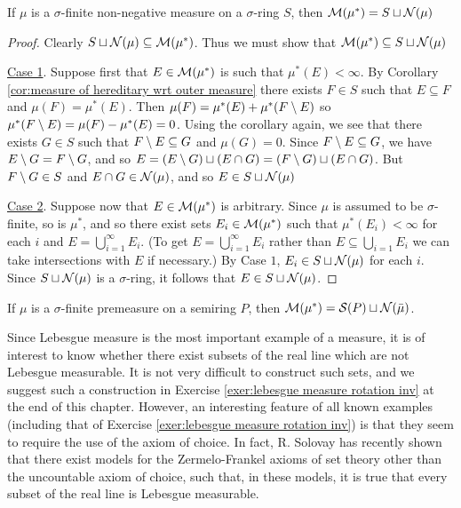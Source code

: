 \begin{theorem}\label{thm:null set completion sigma finite}
If $\mu$ is a $\sigma$-finite non-negative measure on a $\sigma$-ring $S$, then ${\cal M}(\mu^*)=S \sqcup {\cal N}(\mu)$
\end{theorem}

\begin{proof}
Clearly ${S} \sqcup {\cal N}(\mu) \subseteq {\cal M}(\mu^*)$. Thus we must show that ${\cal M}(\mu^*) \subseteq S\sqcup {\cal N}(\mu)$

\underline{Case 1}. Suppose first that $E \in {\cal M}(\mu^*)$ is such that $\mu^*(E)<\infty$. By Corollary \ref{cor:measure of hereditary wrt outer measure} there exists $F \in S$ such that $E \subseteq F$ and $\mu(F)=\mu^*(E)$. Then $\mu(F)=\mu^*(E)+\mu^*(F\setminus E)$ so $\mu^*(F\setminus E)=\mu(F)-\mu^*(E)=0$. Using the corollary again, we see that there exists $G \in S$ such that $F\setminus E\subseteq G$ and $\mu(G)=0$. Since $F\setminus E\subseteq G$, we have $E\setminus G=F\setminus G$, and so $E=(E\setminus G) \sqcup(E\cap G)=(F\setminus G)\sqcup(E\cap G)$. But $F\setminus G\in S$ and $E\cap G\in {\cal N}(\mu)$, and so $E\in S\sqcup {\cal N}(\mu)$

\underline{Case 2}. Suppose now that $E \in {\cal M}(\mu^*)$ is arbitrary. Since $\mu$ is assumed to be $\sigma$-finite, so is $\mu^*$, and so there exist sets $E_i \in {\cal M}(\mu^*)$ such that $\mu^*(E_i)<\infty$ for each $i$ and $E=\bigcup_{i=1}^\infty E_i .$ (To get $E=\bigcup_{i=1}^\infty E_i$ rather than $E \subseteq \bigcup_{i=1} E_i$ we can take intersections with $E$ if necessary.) By Case $1$, $E_i \in {S} \sqcup{\cal N}(\mu)$ for each $i$. Since $S \sqcup {\cal N}(\mu)$ is a $\sigma$-ring, it follows that $E\in S\sqcup{\cal N}(\mu)$.
\end{proof}

\begin{corollary}
If $\mu$ is a $\sigma$-finite premeasure on a semiring $P$, then ${\cal M}(\mu^*)={\cal S}(P) \sqcup{\cal N}(\bar{\mu})$.
\end{corollary}

Since Lebesgue measure is the most important example of a measure, it is of interest to know whether there exist subsets of the real line which are not Lebesgue measurable. It is not very difficult to construct such sets, and we suggest such a construction in Exercise \ref{exer:lebesgue measure rotation inv} at the end of this chapter. However, an interesting feature of all known examples (including that of Exercise \ref{exer:lebesgue measure rotation inv}) is that they seem to require the use of the axiom of choice. In fact, R. Solovay has recently shown that there exist models for the Zermelo-Frankel axioms of set theory other than the uncountable axiom of choice, such that, in these models, it is true that every subset of the real line is Lebesgue measurable.

